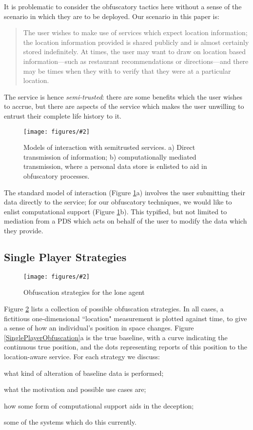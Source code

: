 \documentclass{IOS-Book-Article}     %
\newcommand{\fig}[3][0.9]{
\begin{figure}[tp]
\begin{center}
\texttt{[image: figures/\#2]}
\caption{#3}
\label{fig:#2}
\end{center}
\end{figure}
}
\begin{document}
It is problematic to consider the obfuscatory tactics here without a sense of
the scenario in which they are to be deployed. Our scenario in this paper is:
\begin{quote}
The user wishes to make use of services which expect location information; 
the location information provided is shared publicly and is almost
certainly stored indefinitely. At times, the user may want to draw on location
based information---such as restaurant recommendations or directions---and there
may be times when they with to verify that they were at a particular location.
\end{quote}
The service is hence \emph{semi-trusted}: there are some benefits which the user
wishes to accrue, but there are aspects of the service which makes the user
unwilling to entrust their complete life history to it.

\fig{Mediation}{Models of interaction with semitrusted services. a) Direct
transmission of information; b) computationally mediated transmission, where a
personal data store is enlisted to aid in obfuscatory processes.}

The standard model of interaction (Figure \ref{fig:Mediation}a) involves the
user submitting their data directly to the service; for our obfuscatory
techniques, we would like to enlist computational support (Figure
\ref{fig:Mediation}b). This typified, but not limited to mediation from a PDS
which acts on behalf of the user to modify the data which they provide.

\subsection{Single Player Strategies}

\fig[1.05]{SinglePlayerObfuscation}{Obfuscation strategies for the lone agent}
Figure \ref{fig:SinglePlayerObfuscation} lists a collection of possible
obfuscation strategies. In all cases, a fictitious one-dimensional ``location"
measurement is plotted against time, to give a sense of how an
individual's position in space changes. Figure \ref{SinglePlayerObfuscation}a is
the true baseline, with a curve indicating the continuous true position, and the dots
representing reports of this position to the location-aware service. For each
strategy we discuss: \begin{inparaenum}
\item what kind of alteration of baseline data is performed;
\item what the motivation and possible use cases are;
\item how some form of computational support aids in the deception;
\item some of the systems which do this currently.
\end{inparaenum}
\end{document}
